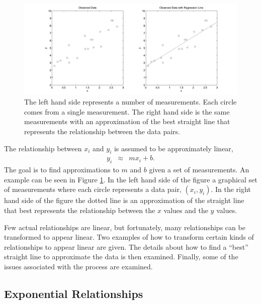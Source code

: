 \documentclass[12pt]{article}
\begin{document}
\begin{figure}[tb]
  \centerline{\includegraphics[width=5.5in]{linearSample}}
  \caption{The left hand side represents a number of
    measurements. Each circle comes from a single measurement. The
    right hand side is the same measurements with an approximation of
    the best straight line that represents the relationship between
    the data pairs.}
  \label{fig:linearRegressionSample}
\end{figure}

The relationship between $x_i$ and $y_i$ is assumed to be
approximately linear,
\begin{eqnarray*}
  y_i & \approx & m x_i + b.
\end{eqnarray*}
The goal is to find approximations to $m$ and $b$ given a set of
measurements.  An example can be seen in Figure
\ref{fig:linearRegressionSample}. In the left hand side of the figure
a graphical set of measurements where each circle represents a data
pair, $(x_i,y_i)$. In the right hand side of the figure the dotted
line is an approximation of the straight line that best represents the
relationship between the $x$ values and the $y$ values.





Few actual relationships are linear, but fortunately, many
relationships can be transformed to appear linear.  Two examples of
how to transform certain kinds of relationships to appear linear are
given. The details about how to find a ``best'' straight line to
approximate the data is then examined.  Finally, some of the issues
associated with the process are examined.



\subsection{Exponential Relationships}
\end{document}
